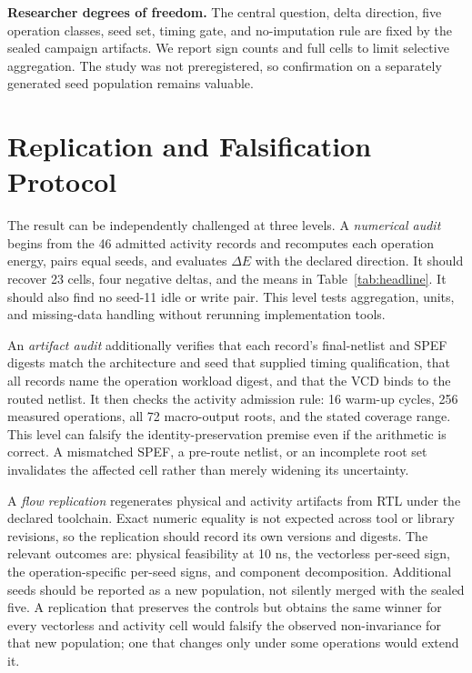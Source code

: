 \documentclass[conference,10pt]{IEEEtran}
\begin{document}
\textbf{Researcher degrees of freedom.} The central question, delta direction, five operation classes, seed set, timing gate, and no-imputation rule are fixed by the sealed campaign artifacts. We report sign counts and full cells to limit selective aggregation. The study was not preregistered, so confirmation on a separately generated seed population remains valuable.

\balance
\section{Replication and Falsification Protocol}
The result can be independently challenged at three levels. A \emph{numerical audit} begins from the 46 admitted activity records and recomputes each operation energy, pairs equal seeds, and evaluates $\Delta E$ with the declared direction. It should recover 23 cells, four negative deltas, and the means in Table~\ref{tab:headline}. It should also find no seed-11 idle or write pair. This level tests aggregation, units, and missing-data handling without rerunning implementation tools.

An \emph{artifact audit} additionally verifies that each record's final-netlist and SPEF digests match the architecture and seed that supplied timing qualification, that all records name the operation workload digest, and that the VCD binds to the routed netlist. It then checks the activity admission rule: 16 warm-up cycles, 256 measured operations, all 72 macro-output roots, and the stated coverage range. This level can falsify the identity-preservation premise even if the arithmetic is correct. A mismatched SPEF, a pre-route netlist, or an incomplete root set invalidates the affected cell rather than merely widening its uncertainty.

A \emph{flow replication} regenerates physical and activity artifacts from RTL under the declared toolchain. Exact numeric equality is not expected across tool or library revisions, so the replication should record its own versions and digests. The relevant outcomes are: physical feasibility at 10 ns, the vectorless per-seed sign, the operation-specific per-seed signs, and component decomposition. Additional seeds should be reported as a new population, not silently merged with the sealed five. A replication that preserves the controls but obtains the same winner for every vectorless and activity cell would falsify the observed non-invariance for that new population; one that changes only under some operations would extend it.
\end{document}
